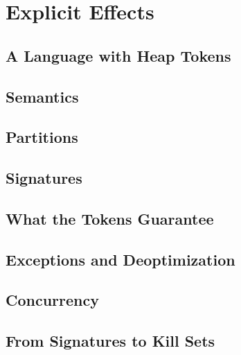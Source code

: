 \chapter{Explicit Effects}\label{chap:effects}

\section{A Language with Heap Tokens}\label{sec:effects-language}

\section{Semantics}\label{sec:effects-semantics}

\section{Partitions}\label{sec:effects-partitions}

\section{Signatures}\label{sec:effects-signatures}

\section{What the Tokens Guarantee}\label{sec:effects-guarantees}

\section{Exceptions and Deoptimization}\label{sec:effects-exceptions}

\section{Concurrency}\label{sec:effects-concurrency}

\section{From Signatures to Kill Sets}\label{sec:effects-kill-sets}
